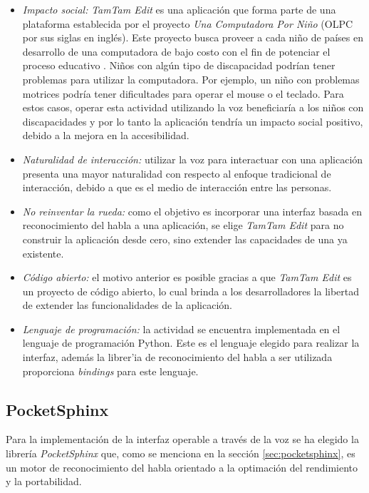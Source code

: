 \begin{itemize}
    \item \emph{Impacto social:} \emph{TamTam Edit} es una aplicaci\'on que forma parte de una plataforma establecida por el
	proyecto \emph{Una Computadora Por Ni\~no} (OLPC por sus siglas en ingl\'es). Este proyecto busca proveer
	a cada ni\~no de pa\'ises en desarrollo de una computadora de bajo costo con el
	fin de potenciar el proceso educativo \cite{OLPC}. Ni\~nos con alg\'un tipo de discapacidad podr\'ian tener
	problemas para utilizar la computadora. Por ejemplo, un ni\~no con problemas motrices podr\'ia tener dificultades para operar el mouse
	o el teclado. Para estos casos, operar esta actividad utilizando la voz beneficiar\'ia a los ni\~nos con discapacidades
	y por lo tanto la aplicaci\'on tendr\'ia un impacto social positivo, debido a la mejora en la accesibilidad.
    \item \emph{Naturalidad de interacci\'on:} utilizar la voz para interactuar con una aplicaci\'on presenta una mayor
	naturalidad con respecto al enfoque tradicional de interacci\'on, debido a que es el medio de
	interacci\'on entre las personas.
    \item \emph{No reinventar la rueda:} como el objetivo es incorporar una interfaz basada en reconocimiento del habla a una aplicaci\'on,
	se elige \emph{TamTam Edit} para no construir la aplicaci\'on desde cero, sino extender las capacidades de una ya existente.
    \item \emph{C\'odigo abierto:} el motivo anterior es posible gracias a que \emph{TamTam Edit} es un proyecto de c\'odigo abierto, lo cual
	brinda a los desarrolladores la libertad de extender las funcionalidades de la aplicaci\'on.
    \item \emph{Lenguaje de programaci\'on:} la actividad se encuentra implementada en el lenguaje de programaci\'on Python. Este es el
	lenguaje elegido para realizar la interfaz, adem\'as la librer'ia de reconocimiento del habla a ser utilizada proporciona
	\emph{bindings} para este lenguaje.
\end{itemize}



\subsection{PocketSphinx}

Para la implementaci\'on de la interfaz operable a trav\'es de la voz se ha elegido la librer\'ia \emph{PocketSphinx} que,
como se menciona en la secci\'on \ref{sec:pocketsphinx}, es un motor de reconocimiento del habla orientado a la optimaci\'on
del rendimiento y la portabilidad.

